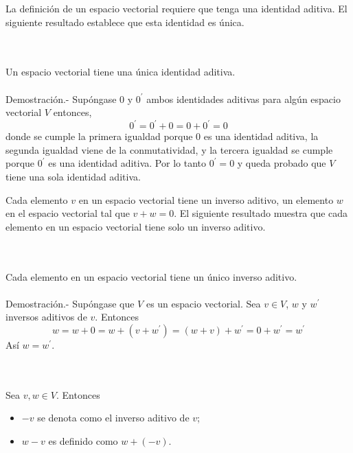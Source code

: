 La definición de un espacio vectorial requiere que tenga una identidad aditiva. El siguiente resultado establece que esta identidad es única.\\

\setcounter{myteo}{24}
\begin{myteo}\; \\\\
    Un espacio vectorial tiene una única identidad aditiva.\\\\
	Demostración.-\; Supóngase $0$ y $0^{'}$ ambos identidades aditivas para algún espacio vectorial $V$ entonces,
	$$0^{'}=0^{'}+0=0+0^{'}=0$$
	donde se cumple la primera igualdad porque $0$ es una identidad aditiva, la segunda igualdad viene de la conmutatividad, y la tercera igualdad se cumple porque $0^{'}$ es una identidad aditiva. Por lo tanto $0^{'}=0$ y queda probado que $V$ tiene una sola identidad aditiva.
\end{myteo}
\vspace{0.3cm}

Cada elemento $v$ en un espacio vectorial tiene un inverso aditivo, un elemento $w$ en el espacio vectorial tal que $v + w = 0$. El siguiente resultado muestra que cada elemento en un espacio vectorial tiene solo un inverso aditivo. \\

\begin{myteo}\; \\\\
    Cada elemento en un espacio vectorial tiene un único inverso aditivo.\\\\
	Demostración.-\; Supóngase que $V$ es un espacio vectorial. Sea $v\in V$,  $w$ y $w^{'}$ inversos aditivos de $v$. Entonces
	$$w=w+0=w+(v+w^{'}) = (w+v)+w^{'}=0+w^{'}=w^{'}$$
	Así $w=w^{'}$. 
\end{myteo}

\begin{mynot}[$\textbf{-v,w-v}$]\,\\\\
	Sea $v,w \in V$. Entonces
	\begin{itemize}
	    \item $-v$ se denota como el inverso aditivo de $v$;
	    \item $w-v$ es definido como $w+(-v)$.
	\end{itemize}
    \end{mynot}

